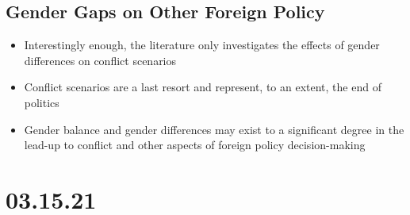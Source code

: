 \documentclass[11pt]{article}
\begin{document}
\subsection*{Gender Gaps on Other Foreign Policy}
\label{sec:org350b8d6}
\begin{itemize}
\item Interestingly enough, the literature only investigates the effects of gender differences on conflict scenarios
\item Conflict scenarios are a last resort and represent, to an extent, the end of politics
\item Gender balance and gender differences may exist to a significant degree in the lead-up to conflict and other aspects of foreign policy decision-making
\end{itemize}
\section*{03.15.21}
\label{sec:org7f3288a}
\end{document}
